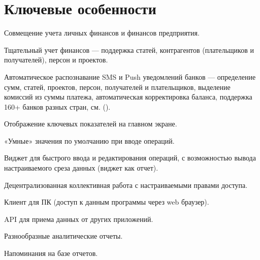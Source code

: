 \documentclass[a4paper,10pt,russian]{sphinxmanual}
\begin{document}
\noindent{}
\noindent{}
\noindent{}


\section{Ключевые особенности}
\label{\detokenize{about:id2}}
\sphinxAtStartPar
Совмещение учета личных финансов и финансов предприятия.

\sphinxAtStartPar
Тщательный учет финансов — поддержка статей, контрагентов (плательщиков и получателей), персон и проектов.

\sphinxAtStartPar
Автоматическое распознавание SMS и Push уведомлений банков — определение сумм, статей, проектов, персон,
получателей и плательщиков, выделение комиссий из суммы платежа, автоматическая корректировка баланса,
поддержка 160+ банков разных стран, см. {\hyperref[\detokenize{banks:chapter-supported-banks}]{}} ().

\sphinxAtStartPar
Отображение ключевых показателей на главном экране.

\sphinxAtStartPar
«Умные» значения по умолчанию при вводе операций.

\sphinxAtStartPar
Виджет для быстрого ввода и редактирования операций, с возможностью вывода настраиваемого среза данных (виджет как отчет).

\sphinxAtStartPar
Децентрализованная коллективная работа с настраиваемыми правами доступа.

\sphinxAtStartPar
Клиент для ПК (доступ к данным программы через web браузер).

\sphinxAtStartPar
API для приема данных от других приложений.

\sphinxAtStartPar
Разнообразные аналитические отчеты.

\sphinxAtStartPar
Напоминания на базе отчетов.
\end{document}
